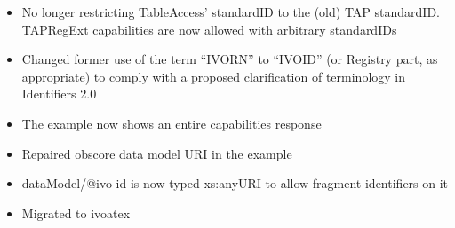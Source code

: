 \documentclass{ivoa}
\begin{document}
\begin{itemize}

\item No longer restricting TableAccess' standardID to the (old)
TAP standardID.  TAPRegExt capabilities are now allowed with arbitrary
standardIDs
\item Changed former use of the term ``IVORN''  to ``IVOID'' (or
Registry part, as appropriate) to comply with a proposed clarification of 
terminology in Identifiers 2.0
\item The example now shows an entire capabilities response
\item Repaired obscore data model URI in the example
\item dataModel/@ivo-id is now typed xs:anyURI
to allow fragment identifiers on it
\item Migrated to ivoatex
\end{itemize}


\end{document}
